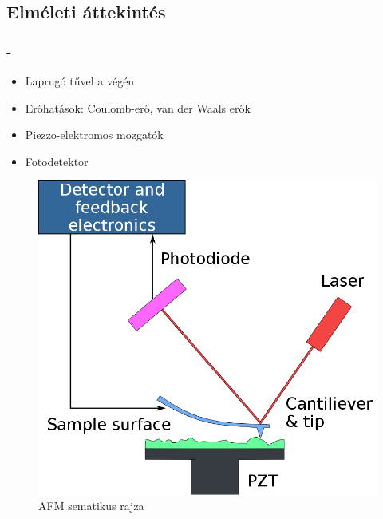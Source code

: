 \documentclass[aspectratio=169]{beamer}
\begin{document}
\subsection{Elméleti áttekintés}
\begin{frame}
\frametitle{\secname{} - \subsecname}
\begin{minipage}{.60\linewidth}
\begin{itemize}
\item Laprugó tűvel a végén
\item Erőhatások: Coulomb-erő, van der Waals erők
\item Piezzo-elektromos mozgatók
\item Fotodetektor
\end{itemize}
\end{minipage}
\hfill
\begin{minipage}[m]{.39\linewidth}
\begin{figure}
\includegraphics[width=.8\textwidth]{afm.png}
\caption{AFM sematikus rajza}
\end{figure}
\end{minipage}
\end{frame}
\end{document}
